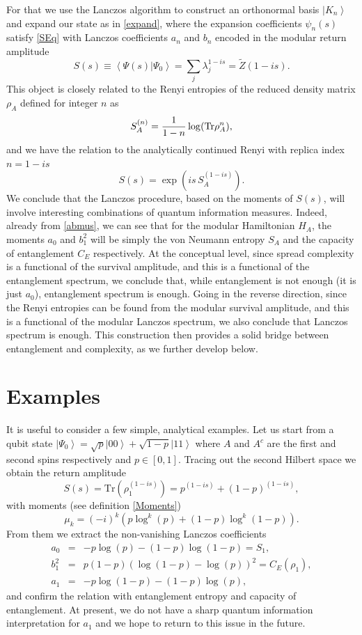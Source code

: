\documentclass[aps,prl,twocolumn,showpacs,preprintnumbers,amsmath,amssymb]{revtex4-1}
\def\frac#1#2{{#1\over #2}}
\newcommand{\Tr}{\text{Tr}}
\def\be{\begin{equation}}
\def\ee{\end{equation}}
\newcommand{\bea}{\begin{eqnarray}}
\newcommand{\eea}{\end{eqnarray}}
\newcommand{\ket}[1]{\left| #1 \right>}
\begin{document}
For that we use the Lanczos algorithm to construct an orthonormal basis $\ket{K_n}$ and expand our state as in \eqref{expand}, where the expansion coefficients $\psi_n(s)$ satisfy \eqref{SEq} with Lanczos coefficients $a_n$ and $b_n$ encoded in the modular return amplitude
\begin{equation}
S(s)\equiv \left<\Psi(s)|\Psi_0\right>=\sum_j \lambda_j^{1-is}=\tilde{Z}(1-is).
\end{equation}
This object is closely related to the Renyi entropies of the reduced density matrix $\rho_A$ defined for integer $n$ as
\be
S^{(n)}_A=\frac{1}{1-n}\log(\Tr\rho^n_A),
\ee
and we have the relation to the analytically continued Renyi with replica index $n=1-is$
\be
S(s)=\exp\left(is\,S^{(1-is)}_A\right).
\ee
We conclude that the Lanczos procedure, based on the moments of $S(s)$, will involve interesting combinations of quantum information measures. Indeed, already from \eqref{abmus}, we can see that for the modular Hamiltonian $H_A$, the moments $a_0$ and $b^2_1$ will be simply the von Neumann entropy $S_A$ and the capacity of entanglement $C_E$ \cite{Yao:2010woi,DeBoer:2018kvc,Kawabata:2021vyo,Okuyama:2021ylc,Arias:2023kni,Nandy:2021hmk} respectively. At the conceptual level, since spread complexity is a functional of the survival amplitude, and this is a functional of the entanglement spectrum, we conclude that, while entanglement is not enough (it is just $a_0$), entanglement spectrum is enough. Going in the reverse direction, since the Renyi entropies can be found from the modular survival amplitude, and this is a functional of the modular Lanczos spectrum, we also conclude that Lanczos spectrum is enough. This construction then provides a solid bridge between entanglement and complexity, as we further develop below.
\section*{Examples}
It is useful to consider a few simple, analytical examples. Let us start from a qubit state $\ket{\Psi_0}=\sqrt{p}\ket{00}+\sqrt{1-p}\ket{11}$ where $A$ and $A^c$ are the first and second spins respectively and $p\in[0,1]$. Tracing out the second Hilbert space we obtain the return amplitude
\be
S(s)=\Tr(\rho^{(1-is)}_1)=p^{(1-is)}+(1-p)^{(1-is)},
\ee
with moments (see definition \eqref{Moments}) 
\be
\mu_k=(-i)^k\left(p\log^k(p)+(1-p)\log^k(1-p)\right).
\ee
From them we extract the non-vanishing Lanczos coefficients
\bea
a_0&=& -p\log(p)-(1-p)\log(1-p) =S_1,\nonumber\\
b^2_1&=&p(1-p)\left(\log(1-p)-\log(p)\right)^2=C_E(\rho_1),\nonumber\\
a_1&=&-p\log(1-p)-(1-p)\log(p),
\eea
and confirm the relation with entanglement entropy and capacity of entanglement. At present, we do not have a sharp quantum information interpretation for $a_1$ and we hope to return to this issue in the future. 
\end{document}
